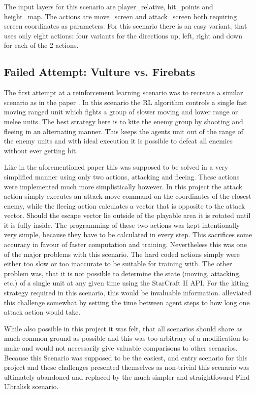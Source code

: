 The input layers for this scenario are player\_relative, hit\_points and height\_map. The actions are move\_screen and attack\_screen both requiring screen coordinates as parameters. For this scenario there is an easy variant, that uses only eight actions: four variants for the directions up, left, right and down for each of the 2 actions.


\subsection{Failed Attempt: Vulture vs. Firebats}
\label{sec:failed}
The first attempt at a reinforcement learning scenario was to recreate a similar scenario as in the paper \citep{broodwarRL}.
In this scenario the RL algorithm controls a single fast moving ranged unit which fights a group of slower moving and lower range or melee units. The best strategy here is to kite the enemy group by shooting and fleeing in an alternating manner. This keeps the agents unit out of the range of the enemy units and with ideal execution it is possible to defeat all enemies without ever getting hit.

Like in the aforementioned paper this was supposed to be solved in a very simplified manner using only two actions, attacking and fleeing. These actions were implemented much more simplistically however. In this project the attack action simply executes an attack move command on the coordinates of the closest enemy, while the fleeing action calculates a vector that is opposite to the attack vector. Should the escape vector lie outside of the playable area it is rotated until it is fully inside. The programming of these two actions was kept intentionally very simple, because they have to be calculated in every step. This sacrifices some accuracy in favour of faster computation and training. Nevertheless this was one of the major problems with this scenario. The hard coded actions simply were either too slow or too inaccurate to be suitable for training with. The other problem was, that it is not possible to determine the state (moving, attacking, etc.) of a single unit at any given time using the StarCraft II API. For the kiting strategy required in this scenario, this would be invaluable information. \citep{broodwarRL} alleviated this challenge somewhat by setting the time between agent steps to how long one attack action would take. 

While also possible in this project it was felt, that all scenarios should share as much common ground as possible and this was too arbitrary of a modification to make and would not necessarily give valuable comparisons to other scenarios. Because this Scenario was supposed to be the easiest, and entry scenario for this project and these challenges presented themselves as non-trivial this scenario was ultimately abandoned and replaced by the much simpler and straightfoward Find Ultralisk scenario.   

